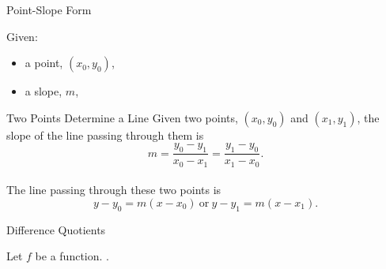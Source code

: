 \documentclass[Lecture.tex]{subfiles}
\begin{document}
\begin{frame}{Point-Slope Form}
  \begin{defn}
    Given: 
    \begin{itemize}
    \item<2->
      a point, $(x_0, y_0)$,
    \item<3->
      a slope, $m$,
    \end{itemize}
  \end{defn}
\end{frame}

\begin{frame}{Two Points Determine a Line}
  Given two points, $(x_0, y_0)$ and $(x_1, y_1)$, the slope of the line passing through them is
  $$m = \frac{y_0 - y_1}{x_0 - x_1} = \frac{y_1 - y_0}{x_1 - x_0}.$$\\
  \pause
  The line passing through these two points is
  $$ y - y_0 = m(x - x_0)\ \text{or}\ y - y_1 = m(x - x_1).$$
\end{frame}


\begin{frame}{Difference Quotients}
  \begin{defn}
    Let $f$ be a function.
    .
  \end{defn}
\end{frame}
\end{document}
